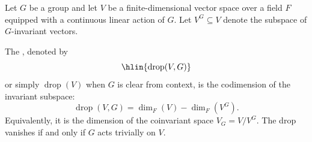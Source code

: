 \begin{definition} \label{definition:drop_of_a_representation_of_a_group_on_a_vector_space}
Let $G$ be a group and let $V$ be a finite-dimensional vector space over a field $F$ equipped with a continuous linear action of $G$. Let $V^G \subseteq V$ denote the subspace of $G$-invariant vectors.

The , denoted by
$$\hlin{\operatorname{drop}(V,G)}$$
or simply $\operatorname{drop}(V)$ when $G$ is clear from context, is the codimension of the invariant subspace:
$$\operatorname{drop}(V,G) = \dim_F(V) - \dim_F(V^G).$$
Equivalently, it is the dimension of the coinvariant space $V_G = V / V^G$. The drop vanishes if and only if $G$ acts trivially on $V$.
\end{definition}
